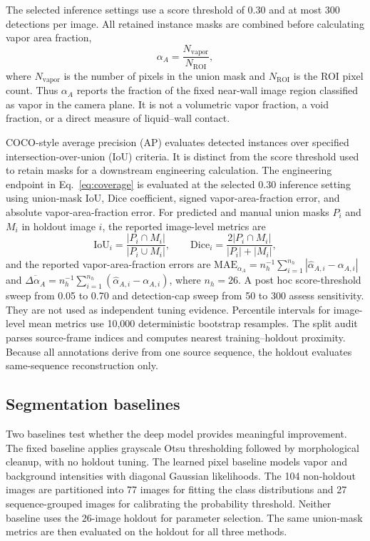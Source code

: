 \documentclass[preprint,12pt,sort&compress]{elsarticle}
\begin{document}
The selected inference settings use a score threshold of 0.30 and at most 300 detections per image. All retained instance masks are combined before calculating vapor area fraction,
\begin{equation}
\alpha_A=\frac{N_{\mathrm{vapor}}}{N_{\mathrm{ROI}}},
\label{eq:coverage}
\end{equation}
where $N_{\mathrm{vapor}}$ is the number of pixels in the union mask and $N_{\mathrm{ROI}}$ is the ROI pixel count. Thus $\alpha_A$ reports the fraction of the fixed near-wall image region classified as vapor in the camera plane. It is not a volumetric vapor fraction, a void fraction, or a direct measure of liquid--wall contact.

COCO-style average precision (AP) evaluates detected instances over specified intersection-over-union (IoU) criteria. It is distinct from the score threshold used to retain masks for a downstream engineering calculation. The engineering endpoint in Eq.~\eqref{eq:coverage} is evaluated at the selected 0.30 inference setting using union-mask IoU, Dice coefficient, signed vapor-area-fraction error, and absolute vapor-area-fraction error. For predicted and manual union masks $P_i$ and $M_i$ in holdout image $i$, the reported image-level metrics are
\begin{equation}
\mathrm{IoU}_i=\frac{|P_i\cap M_i|}{|P_i\cup M_i|},\qquad
\mathrm{Dice}_i=\frac{2|P_i\cap M_i|}{|P_i|+|M_i|},
\label{eq:segmentation_metrics}
\end{equation}
and the reported vapor-area-fraction errors are $\mathrm{MAE}_{\alpha_A}=n_h^{-1}\sum_{i=1}^{n_h}|\widehat{\alpha}_{A,i}-\alpha_{A,i}|$ and $\overline{\Delta\alpha_A}=n_h^{-1}\sum_{i=1}^{n_h}(\widehat{\alpha}_{A,i}-\alpha_{A,i})$, where $n_h=26$. A post hoc score-threshold sweep from 0.05 to 0.70 and detection-cap sweep from 50 to 300 assess sensitivity. They are not used as independent tuning evidence. Percentile intervals for image-level mean metrics use 10,000 deterministic bootstrap resamples. The split audit parses source-frame indices and computes nearest training--holdout proximity. Because all annotations derive from one source sequence, the holdout evaluates same-sequence reconstruction only.

\subsection{Segmentation baselines}

Two baselines test whether the deep model provides meaningful improvement. The fixed baseline applies grayscale Otsu thresholding followed by morphological cleanup, with no holdout tuning. The learned pixel baseline models vapor and background intensities with diagonal Gaussian likelihoods. The 104 non-holdout images are partitioned into 77 images for fitting the class distributions and 27 sequence-grouped images for calibrating the probability threshold. Neither baseline uses the 26-image holdout for parameter selection. The same union-mask metrics are then evaluated on the holdout for all three methods.
\end{document}
